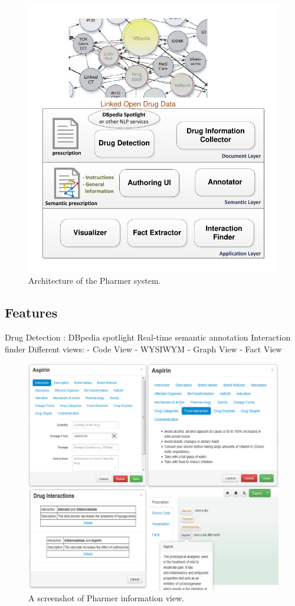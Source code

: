 \documentclass[10pt, conference, compsocconf]{IEEEtran}
\begin{document}
\begin{figure}[tb]
	\centering
		\includegraphics[width=1.0\columnwidth]{images/architecture.pdf}
	\caption{Architecture of the Pharmer system.}
	\label{fig:arch}
\end{figure}

\subsection{Features}
Drug Detection : DBpedia spotlight
Real-time semantic annotation
Interaction finder
Different views:
- Code View
- WYSIWYM
- Graph View
- Fact View

\begin{figure}[tb]
	\centering
		\includegraphics[width=2.0\columnwidth]{images/screenshot1.jpg}
	\caption{A screenshot of Pharmer information view.}
	\label{fig:wysiwym}
\end{figure}
\end{document}
